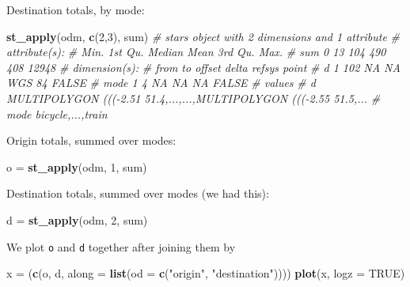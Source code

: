 \documentclass[]{book}
\newenvironment{Shaded}{\begin{snugshade}}{\end{snugshade}}
\newcommand{\CommentTok}[1]{\textcolor[rgb]{0.56,0.35,0.01}{\textit{#1}}}
\newcommand{\DataTypeTok}[1]{\textcolor[rgb]{0.13,0.29,0.53}{#1}}
\newcommand{\DecValTok}[1]{\textcolor[rgb]{0.00,0.00,0.81}{#1}}
\newcommand{\KeywordTok}[1]{\textcolor[rgb]{0.13,0.29,0.53}{\textbf{#1}}}
\newcommand{\NormalTok}[1]{#1}
\newcommand{\OtherTok}[1]{\textcolor[rgb]{0.56,0.35,0.01}{#1}}
\newcommand{\StringTok}[1]{\textcolor[rgb]{0.31,0.60,0.02}{#1}}
\begin{document}
Destination totals, by mode:

\begin{Shaded}
\begin{Highlighting}[]
\KeywordTok{st_apply}\NormalTok{(odm, }\KeywordTok{c}\NormalTok{(}\DecValTok{2}\NormalTok{,}\DecValTok{3}\NormalTok{), sum)}
\CommentTok{# stars object with 2 dimensions and 1 attribute}
\CommentTok{# attribute(s):}
\CommentTok{#      Min. 1st Qu. Median Mean 3rd Qu.  Max.}
\CommentTok{# sum     0      13    104  490     408 12948}
\CommentTok{# dimension(s):}
\CommentTok{#      from  to offset delta refsys point}
\CommentTok{# d       1 102     NA    NA WGS 84 FALSE}
\CommentTok{# mode    1   4     NA    NA     NA FALSE}
\CommentTok{#                                                                 values}
\CommentTok{# d    MULTIPOLYGON (((-2.51 51.4,...,...,MULTIPOLYGON (((-2.55 51.5,...}
\CommentTok{# mode                                                 bicycle,...,train}
\end{Highlighting}
\end{Shaded}

Origin totals, summed over modes:

\begin{Shaded}
\begin{Highlighting}[]
\NormalTok{o =}\StringTok{ }\KeywordTok{st_apply}\NormalTok{(odm, }\DecValTok{1}\NormalTok{, sum)}
\end{Highlighting}
\end{Shaded}

Destination totals, summed over modes (we had this):

\begin{Shaded}
\begin{Highlighting}[]
\NormalTok{d =}\StringTok{ }\KeywordTok{st_apply}\NormalTok{(odm, }\DecValTok{2}\NormalTok{, sum)}
\end{Highlighting}
\end{Shaded}

We plot \texttt{o} and \texttt{d} together after joining them by

\begin{Shaded}
\begin{Highlighting}[]
\NormalTok{x =}\StringTok{ }\NormalTok{(}\KeywordTok{c}\NormalTok{(o, d, }\DataTypeTok{along =} \KeywordTok{list}\NormalTok{(}\DataTypeTok{od =} \KeywordTok{c}\NormalTok{(}\StringTok{"origin"}\NormalTok{, }\StringTok{"destination"}\NormalTok{))))}
\KeywordTok{plot}\NormalTok{(x, }\DataTypeTok{logz =} \OtherTok{TRUE}\NormalTok{)}
\end{Highlighting}
\end{Shaded}
\end{document}
